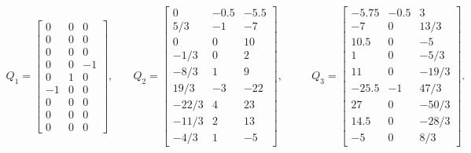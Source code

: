 \documentclass[11pt,reqno,oneside,a4paper]{article}
\theoremstyle{plain} %
\theoremstyle{definition}
\theoremstyle{remark}
\begin{document}
\begin{equation*}
\begin{aligned}
Q_1 = \begin{bmatrix} 0 & 0 & 0 \\ 0 & 0 & 0 \\ 0 & 0 & 0 \\ 0 & 0 & -1 \\ 0 & 1 & 0 \\ -1 & 0 & 0 \\ 0 & 0 & 0 \\ 0 & 0 & 0 \\ 0 & 0 & 0 \end{bmatrix}, &\quad Q_2 = \begin{bmatrix} 0 & -0.5 & -5.5 \\ 5/3 & -1 & -7 \\ 0 & 0 & 10 \\ -1/3 & 0 & 2 \\ -8/3 & 1 & 9 \\ 19/3 & -3 & -22 \\ -22/3 & 4 & 23 \\ -11/3 & 2 & 13 \\ -4/3 & 1 &-5 \end{bmatrix}, &&\quad Q_3 = \begin{bmatrix} -5.75 & -0.5 & 3 \\ -7 & 0 & 13/3 \\ 10.5 & 0 & -5 \\ 1 & 0 & -5/3 \\ 11 & 0 & -19/3 \\ -25.5 & -1 & 47/3 \\ 27 & 0 & -50/3 \\ 14.5 & 0 & -28/3 \\ -5 & 0 & 8/3 \end{bmatrix}. 
\end{aligned}
\end{equation*}
\end{document}

